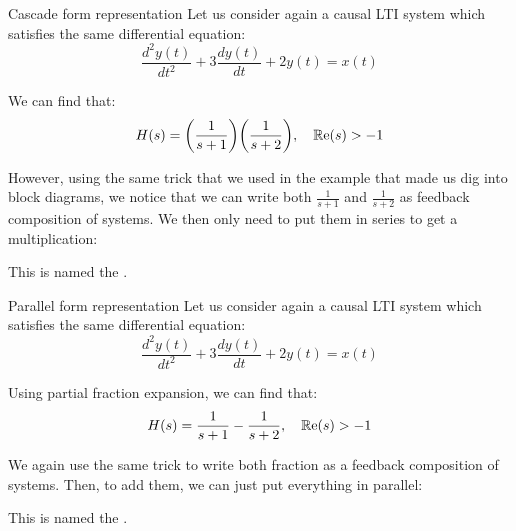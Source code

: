 \documentclass[a4paper]{article}
\begin{document}
\begin{parag}{Cascade form representation}
    Let us consider again a causal LTI system which satisfies the same differential equation: 
    \[\frac{d^2 y\left(t\right)}{dt^2} + 3\frac{dy\left(t\right)}{dt} + 2y\left(t\right) = x\left(t\right)\]

    We can find that: 
    \[H\left(s\right) = \left(\frac{1}{s+1}\right)\left(\frac{1}{s + 2}\right), \mathspace \cre\left(s\right) > -1\]

    However, using the same trick that we used in the example that made us dig into block diagrams, we notice that we can write both $\frac{1}{s+1}$ and $\frac{1}{s+2}$ as feedback composition of systems. We then only need to put them in series to get a multiplication:

    This is named the .
\end{parag}

\begin{parag}{Parallel form representation}
    Let us consider again a causal LTI system which satisfies the same differential equation: 
    \[\frac{d^2 y\left(t\right)}{dt^2} + 3\frac{dy\left(t\right)}{dt} + 2y\left(t\right) = x\left(t\right)\]

    Using partial fraction expansion, we can find that: 
    \[H\left(s\right) = \frac{1}{s+1} - \frac{1}{s+2}, \mathspace \cre\left(s\right) > -1\]

    We again use the same trick to write both fraction as a feedback composition of systems. Then, to add them, we can just put everything in parallel:

    This is named the .
\end{parag}
\end{document}
